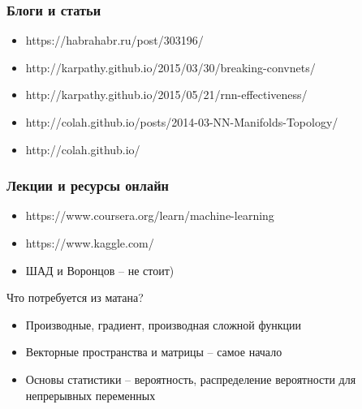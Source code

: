 \documentclass[fullscreen=true, bookmarks=false]{beamer} %
\begin{document}
\begin{frame}
\frametitle{Блоги и статьи}
\begin{itemize}
\item https://habrahabr.ru/post/303196/
\item http://karpathy.github.io/2015/03/30/breaking-convnets/
\item http://karpathy.github.io/2015/05/21/rnn-effectiveness/
\item http://colah.github.io/posts/2014-03-NN-Manifolds-Topology/
\item http://colah.github.io/
\end{itemize}
\end{frame}


\begin{frame}
\frametitle{Лекции и ресурсы онлайн}
\begin{itemize}
\item https://www.coursera.org/learn/machine-learning
\item https://www.kaggle.com/
\item ШАД и Воронцов -- не стоит)
\end{itemize}

Что потребуется из матана?
\begin{itemize}
\item Производные, градиент, производная сложной функции
\item Векторные пространства и матрицы -- самое начало
\item Основы статистики -- вероятность, распределение вероятности для непрерывных переменных
\end{itemize}
\end{frame}

\end{document}
